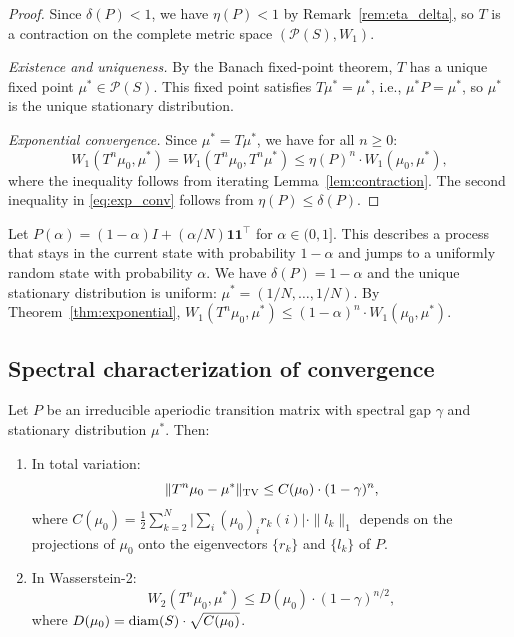\begin{proof}
Since $\delta(P) < 1$, we have $\eta(P) < 1$ by Remark~\ref{rem:eta_delta},
so $T$ is a contraction on the complete metric space $(\mathcal{P}(S), W_1)$.

\emph{Existence and uniqueness.} By the Banach fixed-point theorem, $T$ has a
unique fixed point $\mu^* \in \mathcal{P}(S)$. This fixed point satisfies
$T\mu^* = \mu^*$, i.e., $\mu^* P = \mu^*$, so $\mu^*$ is the unique
stationary distribution.

\emph{Exponential convergence.} Since $\mu^* = T\mu^*$, we have for all
$n \ge 0$:
\[
  W_1(T^n \mu_0, \mu^*) = W_1(T^n \mu_0, T^n \mu^*)
  \le \eta(P)^n \cdot W_1(\mu_0, \mu^*),
\]
where the inequality follows from iterating Lemma~\ref{lem:contraction}.
The second inequality in \eqref{eq:exp_conv} follows from
$\eta(P) \le \delta(P)$.
\end{proof}

\begin{example}\label{ex:lazy}
Let $P(\alpha) = (1 - \alpha) I + (\alpha / N) \mathbf{1}\mathbf{1}^\top$ for
$\alpha \in (0, 1]$. This describes a process that stays in the current state
with probability $1 - \alpha$ and jumps to a uniformly random state with
probability $\alpha$. We have $\delta(P) = 1 - \alpha$ and the unique
stationary distribution is uniform: $\mu^* = (1/N, \ldots, 1/N)$. By
Theorem~\ref{thm:exponential},
$W_1(T^n \mu_0, \mu^*) \le (1 - \alpha)^n \cdot W_1(\mu_0, \mu^*)$.
\end{example}

\subsection{Spectral characterization of convergence}

\begin{theorem}\label{thm:spectral}
Let $P$ be an irreducible aperiodic transition matrix with spectral gap
$\gamma$ and stationary distribution $\mu^*$. Then:
\begin{enumerate}[label=(\roman*)]
\item In total variation:
  \begin{equation}\label{eq:TV_rate}
    \|T^n \mu_0 - \mu^*\|_{\mathrm{TV}} \le C(\mu_0) \cdot (1 - \gamma)^n,
  \end{equation}
  where $C(\mu_0) = \frac{1}{2} \sum_{k=2}^N
  \bigl|\sum_i (\mu_0)_i r_k(i)\bigr| \cdot \|l_k\|_1$ depends on the
  projections of $\mu_0$ onto the eigenvectors $\{r_k\}$ and $\{l_k\}$ of $P$.
\item In Wasserstein-2:
  \begin{equation}\label{eq:W2_rate}
    W_2(T^n \mu_0, \mu^*) \le D(\mu_0) \cdot (1 - \gamma)^{n/2},
  \end{equation}
  where $D(\mu_0) = \mathrm{diam}(S) \cdot \sqrt{C(\mu_0)}$.
\end{enumerate}
\end{theorem}

